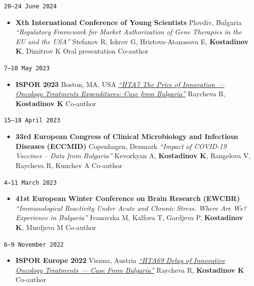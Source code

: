 \documentclass[
  10.5pt,
  a4paper,
  DIV=11,
  numbers=noendperiod]{scrartcl}
\providecommand{\tightlist}{%
  \setlength{\itemsep}{0pt}\setlength{\parskip}{0pt}}
\let\oldtexttt\texttt
\renewcommand{\texttt}[1]{{\color{cvbronze}\small\oldtexttt{#1}}}
\begin{document}
\texttt{20–24\ June\ 2024}

\begin{itemize}
\tightlist
\item
  \textbf{Xth International Conference of Young Scientists} \textbar{}
  Plovdiv, Bulgaria \textbar{} \emph{``Regulatory Framework for Market
  Authorization of Gene Therapies in the EU and the USA''} \textbar{}
  Stefanov R, Iskrov G, Hristova-Atanasova E, \textbf{Kostadinov K},
  Dimitrov K \textbar{} Oral presentation \textbar{} Co-author
\end{itemize}

\texttt{7–10\ May\ 2023}

\begin{itemize}
\tightlist
\item
  \textbf{ISPOR 2023} \textbar{} Boston, MA, USA \textbar{}
  \emph{\href{https://www.ispor.org/heor-resources/presentations-database/presentation/intl2023-3665/126756}{``HTA7
  The Price of Innovation --- Oncology Treatments Expenditures: Case
  from Bulgaria''}} \textbar{} Raycheva R, \textbf{Kostadinov K}
  \textbar{} Co-author
\end{itemize}

\texttt{15–18\ April\ 2023}

\begin{itemize}
\tightlist
\item
  \textbf{33rd European Congress of Clinical Microbiology and Infectious
  Diseases (ECCMID)} \textbar{} Copenhagen, Denmark \textbar{}
  \emph{``Impact of COVID-19 Vaccines -- Data from Bulgaria''}
  \textbar{} Kevorkyan A, \textbf{Kostadinov K}, Rangelova V, Raycheva
  R, Kunchev A \textbar{} Co-author
\end{itemize}

\texttt{4–11\ March\ 2023}

\begin{itemize}
\tightlist
\item
  \textbf{41st European Winter Conference on Brain Research (EWCBR)}
  \textbar{} \emph{``Immunological Reactivity Under Acute and Chronic
  Stress. Where Are We? Experience in Bulgaria''} \textbar{} Ivanovska
  M, Kalfova T, Gardjeva P, \textbf{Kostadinov K}, Murdjeva M \textbar{}
  Co-author
\end{itemize}

\texttt{6–9\ November\ 2022}

\begin{itemize}
\tightlist
\item
  \textbf{ISPOR Europe 2022} \textbar{} Vienna, Austria \textbar{}
  \emph{\href{https://www.ispor.org/heor-resources/presentations-database/presentation/euro2022-3565/120960}{``HTA69
  Delay of Innovative Oncology Treatments --- Case From Bulgaria''}}
  \textbar{} Raycheva R, \textbf{Kostadinov K} \textbar{} Co-author
\end{itemize}
\end{document}
